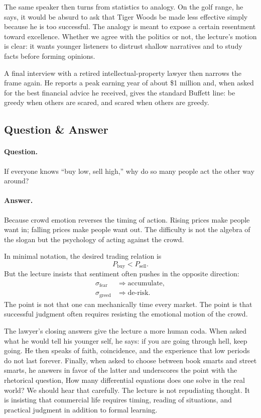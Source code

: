 The same speaker then turns from statistics to analogy. On the golf range, he says, it would be absurd to ask that Tiger Woods be made less effective simply because he is too successful. The analogy is meant to expose a certain resentment toward excellence. Whether we agree with the politics or not, the lecture's motion is clear: it wants younger listeners to distrust shallow narratives and to study facts before forming opinions.

A final interview with a retired intellectual-property lawyer then narrows the frame again. He reports a peak earning year of about \$1 million and, when asked for the best financial advice he received, gives the standard Buffett line: be greedy when others are scared, and scared when others are greedy.

\subsection{Question \& Answer}

\paragraph{Question.} If everyone knows ``buy low, sell high,'' why do so many people act the other way around?

\paragraph{Answer.} Because crowd emotion reverses the timing of action. Rising prices make people want in; falling prices make people want out. The difficulty is not the algebra of the slogan but the psychology of acting against the crowd.

In minimal notation, the desired trading relation is
\begin{equation}
P_{\mathrm{buy}} < P_{\mathrm{sell}}.
\end{equation}
But the lecture insists that sentiment often pushes in the opposite direction:
\begin{align}
\sigma_{\mathrm{fear}} &\Rightarrow \text{accumulate},\\
\sigma_{\mathrm{greed}} &\Rightarrow \text{de-risk}.
\end{align}
The point is not that one can mechanically time every market. The point is that successful judgment often requires resisting the emotional motion of the crowd.

The lawyer's closing answers give the lecture a more human coda. When asked what he would tell his younger self, he says: if you are going through hell, keep going. He then speaks of faith, coincidence, and the experience that low periods do not last forever. Finally, when asked to choose between book smarts and street smarts, he answers in favor of the latter and underscores the point with the rhetorical question, How many differential equations does one solve in the real world? We should hear that carefully. The lecture is not repudiating thought. It is insisting that commercial life requires timing, reading of situations, and practical judgment in addition to formal learning.


